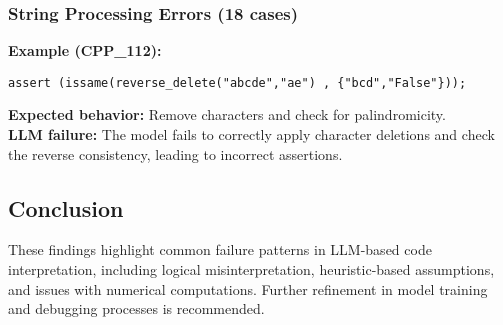 \subsubsection{String Processing Errors (18 cases)}
\textbf{Example (CPP\_112):}
\begin{verbatim}
assert (issame(reverse_delete("abcde","ae") , {"bcd","False"}));
\end{verbatim}
\textbf{Expected behavior:} Remove characters and check for palindromicity.\\
\textbf{LLM failure:} The model fails to correctly apply character deletions and check the reverse consistency, leading to incorrect assertions.


\subsection{Conclusion}
These findings highlight common failure patterns in LLM-based code interpretation, including logical misinterpretation, heuristic-based assumptions, and issues with numerical computations. Further refinement in model training and debugging processes is recommended.



